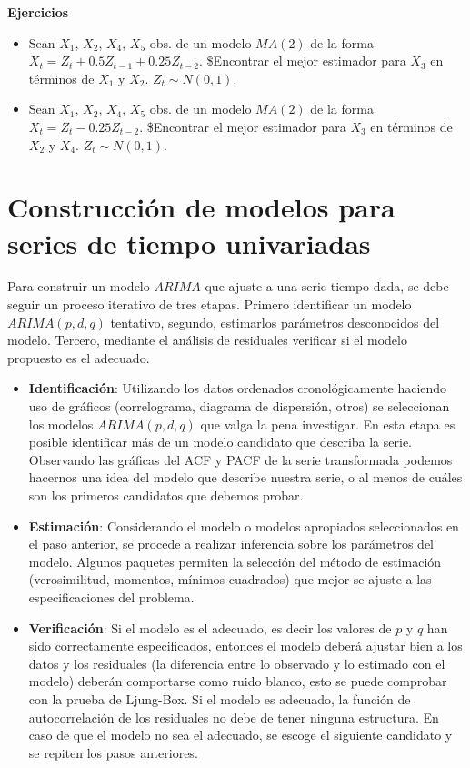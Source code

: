 \documentclass[
  a4paper,
  oneside,
  openany]{book}
\providecommand{\tightlist}{%
  \setlength{\itemsep}{0pt}\setlength{\parskip}{0pt}}
\begin{document}
\textbf{Ejercicios}

\begin{itemize}
\tightlist
\item
  Sean \(X_1\), \(X_2\), \(X_4\), \(X_5\) obs. de un modelo \(MA(2)\) de la forma \(X_t = Z_t+0.5Z_{t-1}+0.25Z_{t-2}\). \$Encontrar el mejor estimador para \(X_3\) en términos de \(X_1\) y \(X_2\). \(Z_t\sim N(0,1)\).
\item
  Sean \(X_1\), \(X_2\), \(X_4\), \(X_5\) obs. de un modelo \(MA(2)\) de la forma \(X_t = Z_t-0.25Z_{t-2}\). \$Encontrar el mejor estimador para \(X_3\) en términos de \(X_2\) y \(X_4\). \(Z_t\sim N(0,1)\).
\end{itemize}

\hypertarget{modelacion-univariada}{%
\chapter{Construcción de modelos para series de tiempo univariadas}\label{modelacion-univariada}}

Para construir un modelo \(ARIMA\) que ajuste a una serie tiempo dada, se debe seguir un proceso iterativo de tres etapas. Primero identificar un modelo \(ARIMA(p,d,q)\) tentativo, segundo, estimarlos parámetros desconocidos del modelo. Tercero, mediante el análisis de residuales verificar si el modelo propuesto es el adecuado.

\begin{itemize}
\tightlist
\item
  \textbf{Identificación}: Utilizando los datos ordenados cronológicamente haciendo uso de gráficos (correlograma, diagrama de dispersión, otros) se seleccionan los modelos \(ARIMA(p,d,q)\) que valga la pena investigar. En esta etapa es posible identificar más de un modelo candidato que describa la serie.
  Observando las gráficas del ACF y PACF de la serie transformada podemos hacernos una idea del modelo que describe nuestra serie, o al menos de cuáles son los primeros candidatos que debemos probar.
\item
  \textbf{Estimación}: Considerando el modelo o modelos apropiados seleccionados en el paso anterior, se procede a realizar inferencia sobre los parámetros del modelo. Algunos paquetes permiten la selección del método de estimación (verosimilitud, momentos, mínimos cuadrados) que mejor se ajuste a las especificaciones del problema.
\item
  \textbf{Verificación}: Si el modelo es el adecuado, es decir los valores de \(p\) y \(q\) han sido correctamente especificados, entonces el modelo deberá ajustar bien a los datos y los residuales (la diferencia entre lo observado y lo estimado con el modelo) deberán comportarse como ruido blanco, esto se puede comprobar con la prueba de Ljung-Box. Si el modelo es adecuado, la función de autocorrelación de los residuales no debe de tener ninguna estructura. En caso de que el modelo no sea el adecuado, se escoge el siguiente candidato y se repiten los pasos anteriores.
\end{itemize}
\end{document}
